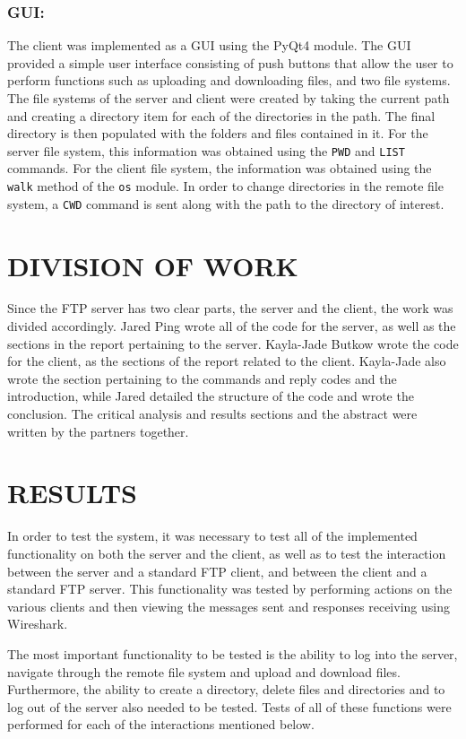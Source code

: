 \documentclass[10pt,twocolumn]{witseiepaper}
\begin{document}
\subsubsection*{GUI:}
The client was implemented as a GUI using the PyQt4 module. The GUI provided a simple user interface consisting of push buttons that allow the user to perform functions such as uploading and downloading files, and two file systems. The file systems of the server and client were created by taking the current path and creating a directory item for each of the directories in the path. The final directory is then populated with the folders and files contained in it. For the server file system, this information was obtained using the \texttt{PWD} and \texttt{LIST} commands. For the client file system, the information was obtained using the \texttt{walk} method of the \texttt{os} module. In order to change directories in the remote file system, a \texttt{CWD} command is sent along with the path to the directory of interest.

\section{DIVISION OF WORK}
Since the FTP server has two clear parts, the server and the client, the work was divided accordingly. Jared Ping wrote all of the code for the server, as well as the sections in the report pertaining to the server. Kayla-Jade Butkow wrote the code for the client, as the sections of the report related to the client. Kayla-Jade also wrote the section pertaining to the commands and reply codes and the introduction, while Jared detailed the structure of the code and wrote the conclusion. The critical analysis and results sections and the abstract were written by the partners together.

\section{RESULTS} \label{sec:results}
In order to test the system, it was necessary to test all of the implemented functionality on both the server and the client, as well as to test the interaction between the server and a standard FTP client, and between the client and a standard FTP server. This functionality was tested by performing actions on the various clients and then viewing the messages sent and responses receiving using Wireshark.

The most important functionality to be tested is the ability to log into the server, navigate through the remote file system and upload and download files. Furthermore, the ability to create a directory, delete files and directories and to log out of the server also needed to be tested. Tests of all of these functions were performed for each of the interactions mentioned below.
\end{document}
